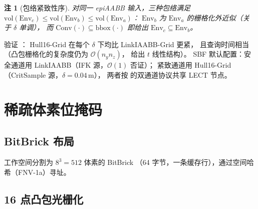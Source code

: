 \documentclass[journal]{IEEEtran}
\newtheorem{remark}{注}
\begin{document}
\begin{remark}[包络紧致性序]\label{prop:env_order}
对同一 epiAABB 输入，三种包络满足
$\mathrm{vol}(\mathrm{Env}_c)
\leq\mathrm{vol}(\mathrm{Env}_b)
\leq\mathrm{vol}(\mathrm{Env}_a)$：
$\mathrm{Env}_b$ 为 $\mathrm{Env}_a$ 的栅格化外近似（关于 $\delta$ 单调），
而 $\mathrm{Conv}(\cdot)\subseteq\mathrm{bbox}(\cdot)$ 即给出
$\mathrm{Env}_c\subseteq\mathrm{Env}_b$。
\end{remark}

\begin{table}[ht]
\centering
\caption{LinkIAABB 包络管线设计权衡}
\label{tab:env_compare}
\end{table}

 验证 ：
Hull16-Grid 在每个 $\delta$ 下均比 LinkIAABB-Grid 更紧，
且查询时间相当（凸包栅格化的复杂度仍为 $\mathcal{O}(n_yn_z)$，
 给出 $t$ 线性结构）。
SBF 默认配置：安全通道用 LinkIAABB（IFK 源，$\mathcal{O}(1)$ 否证）；
紧致通道用 Hull16-Grid（CritSample 源，$\delta=0.04$\,m），
两者按  的双通道协议共享 LECT 节点。

\section{稀疏体素位掩码}\label{sec:voxel}

\subsection{BitBrick 布局}

工作空间分割为 $8^3 = 512$ 体素的 BitBrick
（64 字节，一条缓存行），通过空间哈希（FNV-1a）寻址。

\subsection{16 点凸包光栅化}
\end{document}
